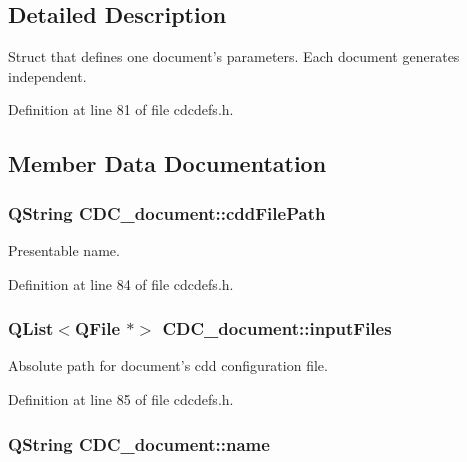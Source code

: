 \subsection{Detailed Description}
Struct that defines one document's parameters. Each document generates independent. 

Definition at line 81 of file cdcdefs.\+h.



\subsection{Member Data Documentation}
\hypertarget{struct_c_d_c__document_a6b9d0b788a21919f9abfe32ea84925cb}{
\subsubsection[{cdd\+File\+Path}]{\setlength{\rightskip}{0pt plus 5cm}Q\+String C\+D\+C\+\_\+document\+::cdd\+File\+Path}}\label{struct_c_d_c__document_a6b9d0b788a21919f9abfe32ea84925cb}


Presentable name. 



Definition at line 84 of file cdcdefs.\+h.

\hypertarget{struct_c_d_c__document_a22550856ea998c3102deb2b8075d128e}{
\subsubsection[{input\+Files}]{\setlength{\rightskip}{0pt plus 5cm}Q\+List$<$Q\+File $\ast$$>$ C\+D\+C\+\_\+document\+::input\+Files}}\label{struct_c_d_c__document_a22550856ea998c3102deb2b8075d128e}


Absolute path for document's cdd configuration file. 



Definition at line 85 of file cdcdefs.\+h.

\hypertarget{struct_c_d_c__document_ad2a1ffe07e12dd635b6f0325633c462c}{
\subsubsection[{name}]{\setlength{\rightskip}{0pt plus 5cm}Q\+String C\+D\+C\+\_\+document\+::name}}\label{struct_c_d_c__document_ad2a1ffe07e12dd635b6f0325633c462c}


